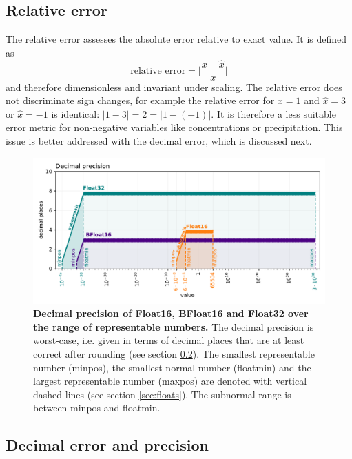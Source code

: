 \subsection{Relative error}
\label{sec:relative_error}

The relative error assesses the absolute error relative to exact value. It is defined as
\begin{equation}
	\text{relative error} = \vert \frac{x - \hat{x}}{x} \vert
	\label{eq:relerror}
\end{equation}
and therefore dimensionless and invariant under scaling. The relative error does not discriminate sign changes, for example
the relative error for $x=1$ and $\hat{x} = 3$ or $\hat{x} = -1$ is identical: $\vert 1- 3 \vert = 2 = \vert 1 - (-1) \vert$. It is therefore
a less suitable error metric for non-negative variables like concentrations or precipitation. This issue is better addressed with
the decimal error, which is discussed next.

\begin{figure}[tbhp]
	\includegraphics[width=1\textwidth]{Figures/methods/float32_16_bfloat_decprec.pdf}
	\caption{\textbf{Decimal precision of Float16, BFloat16 and Float32 over the range of representable numbers.}
	The decimal precision is worst-case, i.e. given in terms of decimal places that are at least correct after rounding
	(see section \ref{sec:decimal_precision}). The smallest representable number (minpos), the smallest normal number
	(floatmin) and the largest representable number (maxpos) are denoted with vertical dashed lines (see section \ref{sec:floats}).
	The subnormal range is between minpos and floatmin.}
	\label{fig:methods_decprec_floats}
\end{figure}

\subsection{Decimal error and precision}
\label{sec:decimal_precision}

